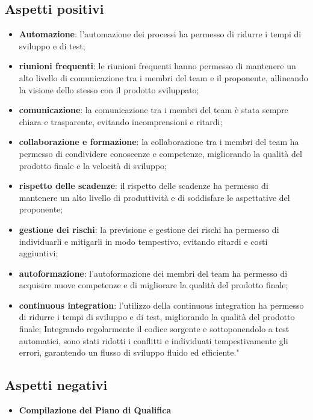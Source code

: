\subsection{Aspetti positivi}
\begin{itemize}
    \item \textbf{Automazione}: l'automazione dei processi ha permesso di ridurre i tempi di sviluppo e di test;
    \item \textbf{riunioni frequenti}: le riunioni frequenti hanno permesso di mantenere un alto livello di comunicazione tra i membri del team e il proponente, allineando la visione dello stesso con il prodotto sviluppato;
    \item \textbf{comunicazione}: la comunicazione tra i membri del team è stata sempre chiara e trasparente, evitando incomprensioni e ritardi;
    \item \textbf{collaborazione e formazione}: la collaborazione tra i membri del team ha permesso di condividere conoscenze e competenze, migliorando la qualità del prodotto finale e la velocità di sviluppo;
    \item \textbf{rispetto delle scadenze}: il rispetto delle scadenze ha permesso di mantenere un alto livello di produttività e di soddisfare le aspettative del proponente;
    \item \textbf{gestione dei rischi}: la previsione e gestione dei rischi ha permesso di individuarli e mitigarli in modo tempestivo, evitando ritardi e costi aggiuntivi;
    \item \textbf{autoformazione}: l'autoformazione dei membri del team ha permesso di acquisire nuove competenze e di migliorare la qualità del prodotto finale;
    \item \textbf{continuous integration}: l'utilizzo della continuous integration ha permesso di ridurre i tempi di sviluppo e di test, migliorando la qualità del prodotto finale;  Integrando regolarmente il codice sorgente e sottoponendolo a test
    automatici, sono stati ridotti i conflitti e individuati tempestivamente gli errori,
    garantendo un flusso di sviluppo fluido ed efficiente."
\end{itemize}

\subsection{Aspetti negativi}
\begin{itemize}
    \item \textbf{Compilazione del Piano di Qualifica}
\end{itemize}